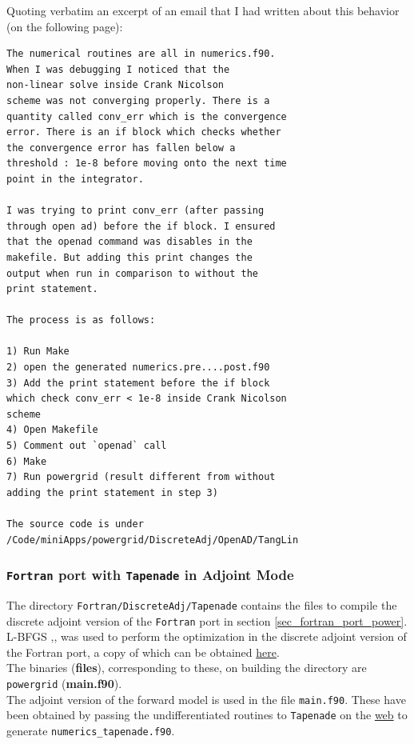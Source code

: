 \noindent Quoting verbatim an excerpt of an email that I had written about this behavior (on the following page):
\clearpage
\begin{Verbatim}[xleftmargin=2em]
The numerical routines are all in numerics.f90. 
When I was debugging I noticed that the 
non-linear solve inside Crank Nicolson 
scheme was not converging properly. There is a 
quantity called conv_err which is the convergence 
error. There is an if block which checks whether
the convergence error has fallen below a 
threshold : 1e-8 before moving onto the next time
point in the integrator. 

I was trying to print conv_err (after passing 
through open ad) before the if block. I ensured
that the openad command was disables in the 
makefile. But adding this print changes the 
output when run in comparison to without the
print statement.

The process is as follows:

1) Run Make
2) open the generated numerics.pre....post.f90
3) Add the print statement before the if block 
which check conv_err < 1e-8 inside Crank Nicolson 
scheme
4) Open Makefile
5) Comment out `openad` call
6) Make
7) Run powergrid (result different from without 
adding the print statement in step 3)

The source code is under 
/Code/miniApps/powergrid/DiscreteAdj/OpenAD/TangLin
\end{Verbatim}
\clearpage
\subsubsection{\texttt{Fortran} port with \texttt{Tapenade} in Adjoint Mode}
\noindent The directory \texttt{Fortran/DiscreteAdj/Tapenade} contains the files to compile the discrete adjoint version of the \texttt{Fortran} port in section \ref{sec_fortran_port_power}. L-BFGS \cite{Byrd_1996},\cite{Zhu_1997},\cite{Morales_2011} was used to perform the optimization in the discrete adjoint version of the Fortran port, a copy of which can be obtained \href{http://users.iems.northwestern.edu/~nocedal/lbfgsb.html}{here}.\\

\noindent The binaries (\textbf{files}), corresponding to these, on building the directory are \texttt{powergrid} (\textbf{{main.f90}}).\\

\noindent The adjoint version of the forward model is used in the file  \texttt{main.f90}. These have been obtained by passing the undifferentiated routines to \texttt{Tapenade} on the \href{http://www-tapenade.inria.fr:8080/tapenade/index.jsp}{web} to generate \texttt{numerics\_tapenade.f90}.\\

